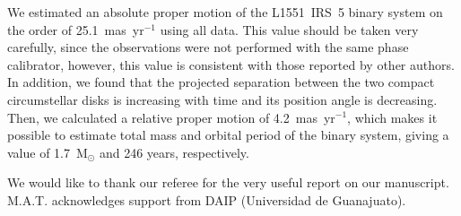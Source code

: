 \documentclass[debug]{rmaa}
\begin{document}
We estimated an absolute proper motion of the L1551~IRS~5 binary system
on the order of 25.1~mas~yr$^{-1}$ using all data. This value should
be taken very carefully, since the observations were not performed with the
same phase calibrator, however, this value is consistent with those reported
by other authors. In addition, we found that the projected separation between
the two compact circumstellar disks is increasing with time and its position
angle is decreasing. Then, we calculated a relative proper motion of 
4.2~mas~yr$^{-1}$, which makes it possible to estimate total mass and orbital
period of the binary system, giving a value of 1.7~M$_{\odot}$ and 246 years,
respectively.


\acknowledgments
We would like to thank our referee for the very useful report on our
manuscript.
M.A.T. acknowledges support from DAIP (Universidad de Guanajuato).
\end{document}
